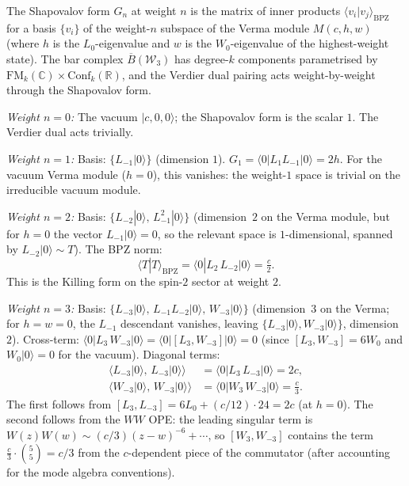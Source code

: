 \documentclass[11pt]{article}
\newcommand{\cW}{\mathcal{W}}
\newcommand{\barB}{\overline{B}}
\newcommand{\C}{\mathbb{C}}
\newcommand{\R}{\mathbb{R}}
\begin{document}
The Shapovalov form $G_n$ at weight $n$ is the matrix of inner
products $\langle v_i | v_j \rangle_{\mathrm{BPZ}}$ for a basis
$\{v_i\}$ of the weight-$n$ subspace of the Verma module
$M(c, h, w)$ (where $h$ is the $L_0$-eigenvalue and $w$ is the
$W_0$-eigenvalue of the highest-weight state).  The bar complex
$\barB(\cW_3)$ has degree-$k$ components parametrised by
$\mathrm{FM}_k(\C) \times \mathrm{Conf}_k(\R)$, and the Verdier
dual pairing acts weight-by-weight through the Shapovalov form.

\medskip
\emph{Weight $n = 0$:}  The vacuum $|c, 0, 0\rangle$; the
Shapovalov form is the scalar $1$.  The Verdier dual acts trivially.

\medskip
\emph{Weight $n = 1$:}  Basis: $\{L_{-1}|0\rangle\}$ (dimension $1$).
$G_1 = \langle 0 | L_1 L_{-1} | 0 \rangle = 2h$.  For the
vacuum Verma module ($h = 0$), this vanishes: the weight-$1$ space
is trivial on the irreducible vacuum module.

\medskip
\emph{Weight $n = 2$:}  Basis: $\{L_{-2}|0\rangle,\, L_{-1}^2|0\rangle\}$
(dimension~$2$ on the Verma module, but for $h = 0$ the vector
$L_{-1}|0\rangle = 0$, so the relevant space is $1$-dimensional,
spanned by $L_{-2}|0\rangle \sim T$).  The BPZ norm:
\begin{equation}
\langle T | T \rangle_{\mathrm{BPZ}}
= \langle 0 | L_2\, L_{-2} | 0 \rangle
= \tfrac{c}{2}.
\end{equation}
This is the Killing form on the spin-$2$ sector at weight $2$.

\medskip
\emph{Weight $n = 3$:}  Basis: $\{L_{-3}|0\rangle,\,
L_{-1}L_{-2}|0\rangle,\, W_{-3}|0\rangle\}$
(dimension~$3$ on the Verma; for $h = w = 0$, the $L_{-1}$
descendant vanishes, leaving $\{L_{-3}|0\rangle, W_{-3}|0\rangle\}$,
dimension~$2$).  Cross-term:
$\langle 0 | L_3\, W_{-3} | 0 \rangle
= \langle 0 | [L_3, W_{-3}] | 0 \rangle = 0$
(since $[L_3, W_{-3}] = 6W_0$ and $W_0|0\rangle = 0$ for the
vacuum).  Diagonal terms:
\begin{align}
\langle L_{-3}|0\rangle,\, L_{-3}|0\rangle \rangle
&= \langle 0 | L_3\, L_{-3} | 0 \rangle = 2c, \\
\langle W_{-3}|0\rangle,\, W_{-3}|0\rangle \rangle
&= \langle 0 | W_3\, W_{-3} | 0 \rangle = \tfrac{c}{3}.
\end{align}
The first follows from $[L_3, L_{-3}] = 6L_0 + (c/12)\cdot 24
= 2c$ (at $h = 0$).  The second follows from the $WW$ OPE:
the leading singular term is $W(z)W(w) \sim (c/3)(z-w)^{-6} + \cdots$,
so $[W_3, W_{-3}]$ contains the term $\frac{c}{3}\cdot\binom{5}{5}
= c/3$ from the $c$-dependent piece of the commutator (after
accounting for the mode algebra conventions).
\end{document}
